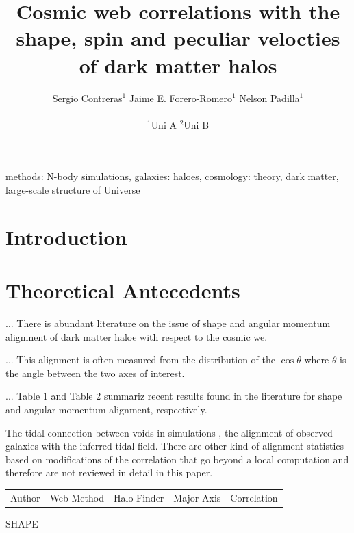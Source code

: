 \documentclass[usenatbib]{mn2e}
\begin{document}
\title[Vweb \& Tweb]{Cosmic web correlations with the shape, spin and
  peculiar velocties of dark matter halos}  
\author[S. Contreras et al.]{
\parbox[t]{\textwidth}{\raggedright 
  Sergio Contreras$^{1}$ 
  Jaime E. Forero-Romero$^{1}$ 
  Nelson Padilla$^{1}$ 
}
\vspace*{6pt}\\
$^{1}$Uni A
$^{2}$Uni B
}
\maketitle

\begin{abstract}

\end{abstract}
\begin{keywords}
methods: N-body simulations, galaxies: haloes, cosmology: theory, dark
matter, large-scale structure of Universe 
\end{keywords}


\section{Introduction}
\label{sec:introduction}


\section{Theoretical Antecedents}
\label{sec:theory}

... There is abundant literature on the issue of shape and angular momentum
aligmnent of dark matter haloe with respect to the cosmic we.

... This alignment is often measured from the distribution of the
$\cos\theta$ where $\theta$ is the angle between the two axes of
interest.

... Table 1 and Table 2 summariz recent results found in the literature for
shape and angular momentum alignment, respectively.

The tidal connection between voids in simulations \citep{Platen2008},
the alignment of observed galaxies with the inferred tidal
field\citep{Lee2007,Jones2010}. There are other kind of alignment
statistics based on modifications of the correlation
\citep{Paz2008,Faltenbacher2009} that go beyond a local computation
and therefore are not reviewed in detail in this paper.


\begin{table}
\begin{tabular}{lllll}
Author & Web Method & Halo Finder & Major Axis & Correlation\\
\end{tabular}
SHAPE
\end{table}
\end{document}
